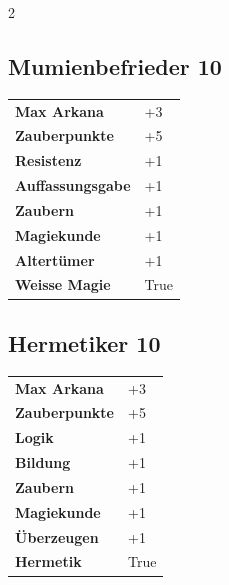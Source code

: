 \begin{multicols}{2}
\begin{tcolorbox}

\end{tcolorbox}

\begin{tcolorbox}
    \subsection*{Mumienbefrieder \hfill \small{10 }}
    \tcblower




\begin{tabular}{@{}ll@{}}
    \textbf{Max Arkana} & +3\\
    \textbf{Zauberpunkte} & +5\\
    \textbf{Resistenz} & +1\\
    \textbf{Auffassungsgabe} & +1\\
    \textbf{Zaubern} & +1\\
    \textbf{Magiekunde} & +1\\
    \textbf{Altertümer} & +1\\
    \textbf{Weisse Magie} & True\\
\end{tabular}


\end{tcolorbox}

\begin{tcolorbox}
    \subsection*{Hermetiker \hfill \small{10 }}
    \tcblower




\begin{tabular}{@{}ll@{}}
    \textbf{Max Arkana} & +3\\
    \textbf{Zauberpunkte} & +5\\
    \textbf{Logik} & +1\\
    \textbf{Bildung} & +1\\
    \textbf{Zaubern} & +1\\
    \textbf{Magiekunde} & +1\\
    \textbf{Überzeugen} & +1\\
    \textbf{Hermetik} & True\\
\end{tabular}


\end{tcolorbox}
\end{multicols}
